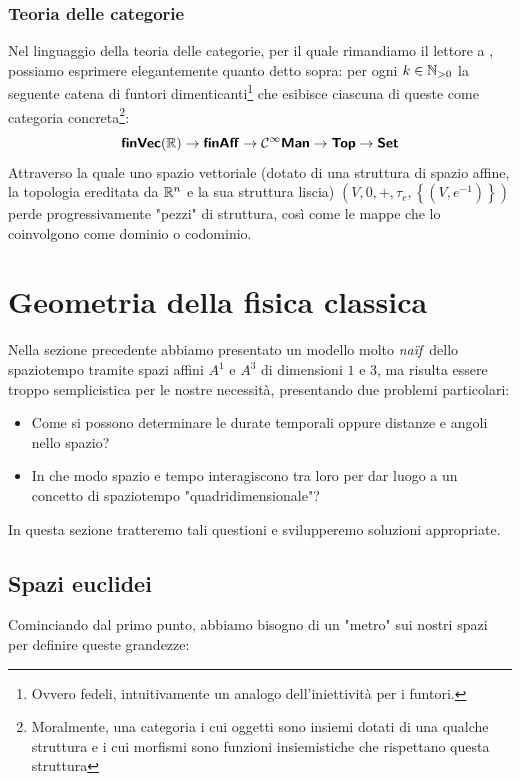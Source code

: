 \documentclass[openany]{book}
\renewcommand\C{\mc{C}}
\begin{document}
\subsubsection{Teoria delle categorie}

Nel linguaggio della teoria delle categorie, per il quale rimandiamo il lettore a \cite{Riehl2017}, possiamo esprimere elegantemente quanto detto sopra: per ogni $k \in \mathbb{N}_{>0}$ la seguente catena di funtori dimenticanti\footnote{Ovvero fedeli, intuitivamente un analogo dell'iniettività per i funtori.} che esibisce ciascuna di queste come categoria concreta\footnote{Moralmente, una categoria i cui oggetti sono insiemi dotati di una qualche struttura e i cui morfismi sono funzioni insiemistiche che rispettano questa struttura}:
\[ \catname{finVec}(\R) \to \catname{finAff} \to \C^\infty\catname{Man} \to \topcat \to \setcat \]
Attraverso la quale uno spazio vettoriale (dotato di una struttura di spazio affine, la topologia ereditata da $\mathbb{R}^n$ e la sua struttura liscia) $\left( V,0,+,\tau_e,\left\{(V, e^{-1})\right\}\right)$ perde progressivamente "pezzi" di struttura, così come le mappe che lo coinvolgono come dominio o codominio.

\newpage
\section{Geometria della fisica classica}

\newcommand\naif{\textit{naïf}\ }
Nella sezione precedente abbiamo presentato un modello molto \naif dello spaziotempo tramite spazi affini $A^1$ e $A^3$ di dimensioni $1$ e $3$, ma risulta essere troppo semplicistica per le nostre necessità, presentando due problemi particolari:\begin{itemize}
    \item Come si possono determinare le durate temporali oppure distanze e angoli nello spazio?
    \item In che modo spazio e tempo interagiscono tra loro per dar luogo a un concetto di spaziotempo "quadridimensionale"?
\end{itemize}
In questa sezione tratteremo tali questioni e svilupperemo soluzioni appropriate. 

\subsection{Spazi euclidei}

Cominciando dal primo punto, abbiamo bisogno di un "metro" sui nostri spazi per definire queste grandezze:
\end{document}
